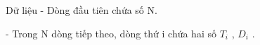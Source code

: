 Dữ liệu
- Dòng đầu tiên chứa số N.   


   - Trong N dòng tiếp theo, dòng thứ i chứa hai số $T_{i}$   , $D_{i}$   .